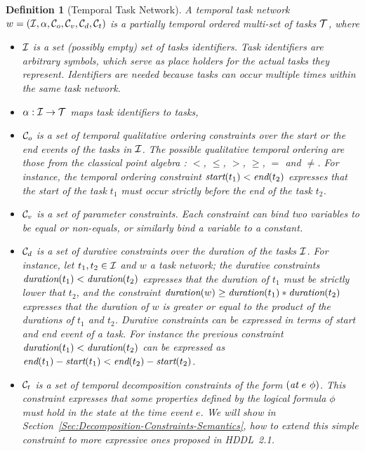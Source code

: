 \documentclass[letterpaper]{article} %
\newtheorem{definition}{Definition}
\newcommand{\at}{\text{\it at}}
\newcommand{\duration}{\text{\it duration}}
\newcommand{\tstart}{\text{\it start}}
\newcommand{\tend}{\text{\it end}}
\begin{document}
\begin{definition}[Temporal Task Network]
A temporal task network $w = ({\cal{I}}, \alpha, {\cal{C}}_o, {\cal{C}}_v, {\cal{C}}_d, {\cal{C}}_t)$ is a partially temporal ordered multi-set of tasks $\cal{T}$, where
\begin{itemize}

    \item $\cal{I}$ is a set (possibly empty) set of tasks identifiers. Task identifiers are arbitrary symbols, which serve as place holders for the actual tasks they represent. Identifiers are needed because tasks can occur multiple times within the same task network.

    \item $\alpha: {\cal{I}} \rightarrow {\cal{T}}$ maps task identifiers to tasks,

    \item ${\cal{C}}_o$ is a set of temporal qualitative ordering constraints over the start or the end events of the tasks in $\cal{I}$. The possible qualitative temporal ordering are those from the classical point algebra \cite{broxvall03}: $<$, $\leq$, $>$, $\geq$, $=$ and $\neq$. For instance, the temporal ordering constraint $\tstart(t_1) < \tend(t_2)$ expresses that the start of the task $t_1$ must occur strictly  before the end of the task $t_2$.

    \item ${\cal{C}}_v$ is a set of parameter constraints. Each constraint can bind two variables to be equal or non-equals, or similarly bind a variable to a constant. %

    \item ${\cal{C}}_d$ is a set of durative constraints over the duration of the tasks $\cal{I}$. For instance, let $t_1, t_2 \in {\cal{I}}$ and $w$ a task network; the durative constraints $\duration(t_1) < \duration(t_2)$ expresses that the duration of $t_1$ must be strictly lower that $t_2$, and the constraint $\duration(w) \geq \duration(t_1) * \duration(t_2)$ expresses that the duration of $w$ is greater or equal to the product of the durations of $t_1$ and $t_2$. Durative constraints can be expressed in terms of start and end event of a task. For instance the previous constraint $\duration(t_1) < \duration(t_2)$ can be expressed as  $\tend(t_1) - \tstart(t_1) < \tend(t_2) - \tstart(t_2)$.

    \item ${\cal{C}}_t$ is a set of temporal decomposition constraints of the form $(\at \ e \ \phi)$. This constraint expresses that some properties defined by the logical formula $\phi$ must hold in the state at the time event $e$. We will show in Section~\ref{Sec:Decomposition-Constraints-Semantics}, how to extend this simple constraint to more expressive ones proposed in HDDL~2.1.
   \end{itemize}
\end{definition}
\end{document}
